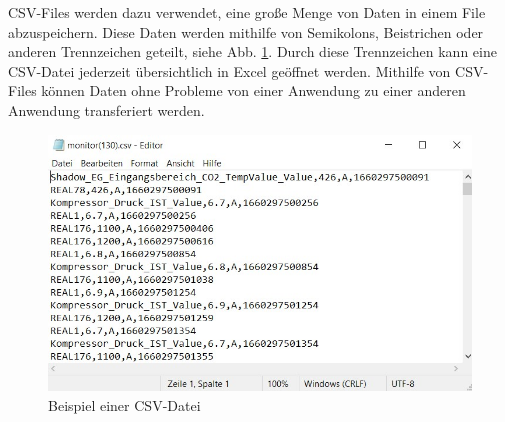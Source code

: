 CSV-Files werden dazu verwendet, eine große Menge von Daten in einem File abzuspeichern. Diese Daten werden mithilfe von Semikolons, Beistrichen oder anderen Trennzeichen geteilt, siehe Abb. \ref{fig:impl:csvDateiEditor}. Durch diese Trennzeichen kann eine CSV-Datei jederzeit übersichtlich in Excel geöffnet werden. Mithilfe von CSV-Files können Daten ohne Probleme von einer Anwendung zu einer anderen Anwendung transferiert werden. \cite{csvOrJson}

\begin{figure}[h t]
    \centering
    \includegraphics[scale=0.5]{pics/csvFileEditor.jpg}
    \caption{Beispiel einer CSV-Datei}
    \label{fig:impl:csvDateiEditor}
  \end{figure}
  